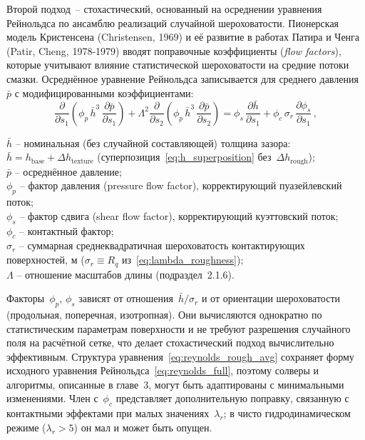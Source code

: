 Второй подход~-- стохастический, основанный на осреднении
уравнения Рейнольдса по ансамблю реализаций случайной
шероховатости. Пионерская модель Кристенсена (Christensen, 1969)
и её развитие в работах Патира и Ченга (Patir, Cheng, 1978-1979)
вводят поправочные коэффициенты (\textit{flow factors}), которые
учитывают влияние статистической шероховатости на средние потоки
смазки. Осреднённое уравнение Рейнольдса записывается для
среднего давления~$\bar{p}$ с модифицированными коэффициентами:
\begin{equation}
  \frac{\partial}{\partial s_1}\!\left(\phi_p\,\bar{h}^3\,
  \frac{\partial \bar{p}}{\partial s_1}\right)
  + \Lambda^2\frac{\partial}{\partial s_2}\!\left(\phi_p\,\bar{h}^3\,
  \frac{\partial \bar{p}}{\partial s_2}\right)
  = \phi_s\,\frac{\partial \bar{h}}{\partial s_1}
  + \phi_c\,\sigma_r\,\frac{\partial \phi_s}{\partial s_1}\,,
  \label{eq:reynolds_rough_avg}
\end{equation}
\begin{conditions}
$\bar{h}$ -- номинальная (без случайной составляющей) толщина зазора: $\bar{h} = h_{\mathrm{base}} + \Delta h_{\mathrm{texture}}$ (суперпозиция~\eqref{eq:h_superposition} без~$\Delta h_{\mathrm{rough}}$);\\
$\bar{p}$ -- осреднённое давление;\\
$\phi_p$ -- фактор давления (pressure flow factor),
корректирующий пуазейлевский поток;\\
$\phi_s$ -- фактор сдвига (shear flow factor),
корректирующий куэттовский поток;\\
$\phi_c$ -- контактный фактор;\\
$\sigma_r$ -- суммарная среднеквадратичная шероховатость
контактирующих поверхностей, м ($\sigma_r \equiv R_q$ из~\eqref{eq:lambda_roughness});\\
$\Lambda$ -- отношение масштабов длины
(подраздел~2.1.6).
\end{conditions}
Факторы~$\phi_p$, $\phi_s$ зависят от отношения~$\bar{h}/\sigma_r$
и от ориентации шероховатости (продольная, поперечная,
изотропная). Они вычисляются однократно по статистическим
параметрам поверхности и не требуют разрешения случайного поля
на расчётной сетке, что делает стохастический подход
вычислительно эффективным. Структура
уравнения~\eqref{eq:reynolds_rough_avg} сохраняет форму исходного
уравнения Рейнольдса~\eqref{eq:reynolds_full}, поэтому солверы
и алгоритмы, описанные в главе~3, могут быть адаптированы
с минимальными изменениями. Член с~$\phi_c$ представляет дополнительную поправку, связанную с контактными эффектами при малых значениях~$\lambda_r$; в чисто гидродинамическом режиме ($\lambda_r > 5$) он мал и может быть опущен.

